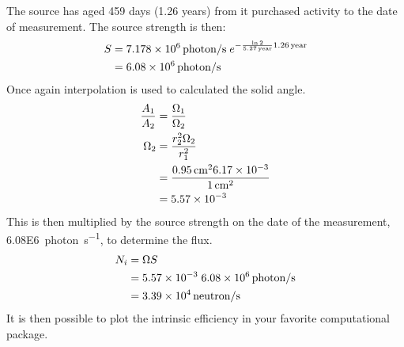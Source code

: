 \documentclass[draftcls,onecolumn]{IEEEtran}
\begin{document}
\begin{Exercise*}[label={LiBorateGlass},title={Li borate glass},name={Example}]
The  source has aged 459 days (1.26 years) from it purchased activity to the date of measurement.
The source strength is then:
\begin{align}
  S &= \SI{7.178E6}{photon\per\second}\;e^{-\frac{ \ln{2}}{\SI{5.27}{year}}\SI{1.26}{year}} \\ \notag
    &= \SI{6.08E6}{photon\per\second}
\end{align}
Once again interpolation is used to calculated the solid angle.
\begin{align*}
	\frac{A_1}{A_2} &= \frac{\Omega_1}{\Omega_2} \\ \notag
	\Omega_2 &= \frac{r_2^2 \Omega_2}{r_1^2} \\
	 &= \frac{\SI{0.95}{\cm}^2 \num{6.17E-3}}{\SI{1}{\cm}^2} \\
	 &= \num{5.57E-3}
\end{align*}
This is then multiplied by the source strength on the date of the measurement, \SI{6.08E6}{photon\per\second}, to determine the flux.
\begin{align*}
 	N_i &= \Omega S \\
	 &= \num{5.57E-3} \; \SI{6.08E6}{photon\per\second} \\
      &= \SI{3.39E4}{neutron\per\second}
\end{align*}
It is then possible to plot the intrinsic efficiency in your favorite computational package.

\end{Exercise*}
\end{document}
